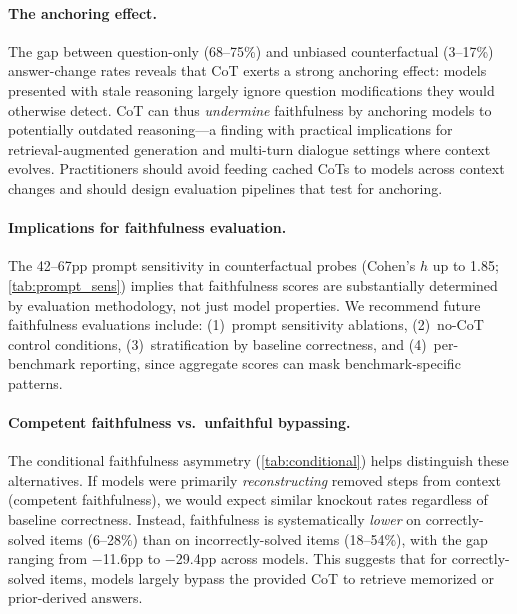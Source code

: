 \documentclass[11pt]{article}
\begin{document}
\paragraph{The anchoring effect.} The gap between question-only (68--75\%) and unbiased counterfactual (3--17\%) answer-change rates reveals that CoT exerts a strong anchoring effect: models presented with stale reasoning largely ignore question modifications they would otherwise detect. CoT can thus \emph{undermine} faithfulness by anchoring models to potentially outdated reasoning---a finding with practical implications for retrieval-augmented generation and multi-turn dialogue settings where context evolves. Practitioners should avoid feeding cached CoTs to models across context changes and should design evaluation pipelines that test for anchoring.

\paragraph{Implications for faithfulness evaluation.} The 42--67pp prompt sensitivity in counterfactual probes (Cohen's $h$ up to 1.85; \autoref{tab:prompt_sens}) implies that faithfulness scores are substantially determined by evaluation methodology, not just model properties. We recommend future faithfulness evaluations include: (1)~prompt sensitivity ablations, (2)~no-CoT control conditions, (3)~stratification by baseline correctness, and (4)~per-benchmark reporting, since aggregate scores can mask benchmark-specific patterns.

\paragraph{Competent faithfulness vs.\ unfaithful bypassing.} The conditional faithfulness asymmetry (\autoref{tab:conditional}) helps distinguish these alternatives. If models were primarily \emph{reconstructing} removed steps from context (competent faithfulness), we would expect similar knockout rates regardless of baseline correctness. Instead, faithfulness is systematically \emph{lower} on correctly-solved items (6--28\%) than on incorrectly-solved items (18--54\%), with the gap ranging from $-$11.6pp to $-$29.4pp across models. This suggests that for correctly-solved items, models largely bypass the provided CoT to retrieve memorized or prior-derived answers.

\end{document}
